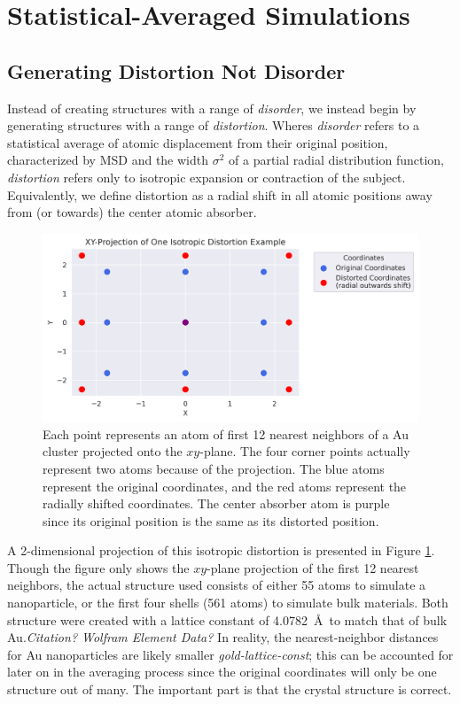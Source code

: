 \section{Statistical-Averaged Simulations}

\subsection{Generating Distortion Not Disorder} \label{sec:start-disorder}
Instead of creating structures with a range of \textit{disorder}, we instead begin by generating structures with a range of \textit{distortion}. Wheres \textit{disorder} refers to a statistical average of atomic displacement from their original position, characterized by MSD and the width $ \sigma^2 $ of a partial radial distribution function, \textit{distortion} refers only to isotropic expansion or contraction of the subject. Equivalently, we define distortion as a radial shift in all atomic positions away from (or towards) the center atomic absorber.

\begin{figure}[h]
	\centering
	\includegraphics[width=\linewidth]{Chapters/Figures/2d_distortion_example.png}
	\caption[2D Distortion]{Each point represents an atom of first 12 nearest neighbors of a Au cluster projected onto the $xy$\nobreakdash-plane. The four corner points actually represent two atoms because of the projection. The blue atoms represent the original coordinates, and the red atoms represent the radially shifted coordinates. The center absorber atom is purple since its original position is the same as its distorted position.}
	\label{fig:2d-distortion}
\end{figure}

A 2-dimensional projection of this isotropic distortion is presented in Figure \ref{fig:2d-distortion}. Though the figure only shows the $xy$\nobreakdash-plane projection of the first 12 nearest neighbors, the actual structure used consists of either 55 atoms to simulate a nanoparticle, or the first four shells (561 atoms) to simulate bulk materials. Both structure were created with a lattice constant of 4.0782~\AA~to match that of bulk Au.\textit{Citation? Wolfram Element Data?} In reality, the nearest-neighbor distances for Au nanoparticles are likely smaller \textit{gold-lattice-const}; this can be accounted for later on in the averaging process since the original coordinates will only be one structure out of many. The important part is that the crystal structure is correct. 

